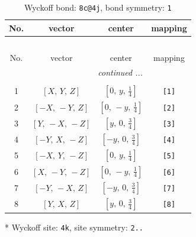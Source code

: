 \documentclass[fleqn,8pt]{jsarticle}
\begin{document}
\renewcommand{\arraystretch}{1.2}
\begin{longtable}{cccc}
\caption{Wyckoff bond: {\tt 8c@4j}, bond symmetry: {\tt 1}}
 \\
 \hline \hline
No. & vector & center & mapping \\ \hline \endfirsthead

\multicolumn{3}{l}{\tablename\ \thetable{}} \\
 \hline \hline
No. & vector & center & mapping \\ \hline \endhead

 \hline \hline
\multicolumn{3}{r}{\footnotesize\it continued ...} \\ \endfoot

 \hline \hline
\multicolumn{3}{r}{} \\ \endlastfoot

1 & $\left[ X,\, Y,\, Z \right]$ & $\left[ 0,\, y,\, \frac{1}{4} \right]$ & {\tt [1]} \\ \hline
2 & $\left[ - X,\, - Y,\, Z \right]$ & $\left[ 0,\, - y,\, \frac{1}{4} \right]$ & {\tt [2]} \\ \hline
3 & $\left[ Y,\, - X,\, - Z \right]$ & $\left[ y,\, 0,\, \frac{3}{4} \right]$ & {\tt [3]} \\ \hline
4 & $\left[ - Y,\, X,\, - Z \right]$ & $\left[ - y,\, 0,\, \frac{3}{4} \right]$ & {\tt [4]} \\ \hline
5 & $\left[ - X,\, Y,\, - Z \right]$ & $\left[ 0,\, y,\, \frac{1}{4} \right]$ & {\tt [5]} \\ \hline
6 & $\left[ X,\, - Y,\, - Z \right]$ & $\left[ 0,\, - y,\, \frac{1}{4} \right]$ & {\tt [6]} \\ \hline
7 & $\left[ - Y,\, - X,\, Z \right]$ & $\left[ - y,\, 0,\, \frac{3}{4} \right]$ & {\tt [7]} \\ \hline
8 & $\left[ Y,\, X,\, Z \right]$ & $\left[ y,\, 0,\, \frac{3}{4} \right]$ & {\tt [8]} \\
\end{longtable}
* Wyckoff site: {\tt 4k}, site symmetry: {\tt 2..}
\renewcommand{\arraystretch}{1.2}
\end{document}
